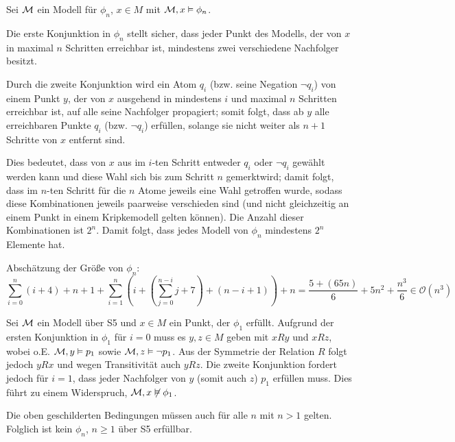 Sei $\mathcal{M}$ ein Modell für $\phi_n$, $x\in M$ mit $\mathcal{M}, x \vDash
\phi_n$.

Die erste Konjunktion in $\phi_n$ stellt sicher, dass jeder Punkt des
Modells, der von $x$ in maximal $n$ Schritten erreichbar ist, mindestens zwei
verschiedene Nachfolger besitzt.

Durch die zweite Konjunktion wird ein Atom $q_i$ (bzw. seine Negation $\neg q_i$)
von einem Punkt $y$, der von $x$ ausgehend in mindestens $i$ und maximal $n$
Schritten erreichbar ist, auf alle seine Nachfolger propagiert; somit folgt,
dass ab $y$ alle erreichbaren Punkte $q_i$ (bzw. $\neg q_i$) erfüllen,
solange sie nicht weiter als $n+1$ Schritte von $x$ entfernt sind.

Dies bedeutet, dass von $x$ aus im $i$-ten Schritt entweder $q_i$ oder $\neg
q_i$ gewählt werden kann und diese Wahl sich bis zum Schritt $n$ \glqq
gemerkt\grqq wird; damit folgt, dass im $n$-ten Schritt für die $n$ Atome
jeweils eine Wahl getroffen wurde, sodass diese Kombinationen jeweils paarweise
verschieden sind (und nicht gleichzeitig an einem Punkt in einem Kripkemodell
gelten können). Die Anzahl dieser Kombinationen ist $2^n$. Damit folgt, dass
jedes Modell von $\phi_n$ mindestens $2^n$ Elemente hat.

Abschätzung der Größe von $\phi_n$:
\[
\sum_{i=0}^{n}(i + 4) + n + 1 + \sum_{i=1}^{n}\left(i + \left(\sum_{j=0}^{n-i}
j + 7\right) + (n - i + 1) \right) + n = \frac{5+(65 n)}{6}+5 n^2+\frac{n^3}{6}
\in \mathcal{O}(n^3)
\]

Sei $\mathcal{M}$ ein Modell über S5 und $x \in M$ ein Punkt, der $\phi_1$ erfüllt. Aufgrund der ersten Konjunktion in
$\phi_1$ für $i = 0$ muss es $y, z \in M$ geben mit $xRy$ und $xRz$, wobei o.E. $\mathcal{M}, y \vDash p_1$ sowie
$\mathcal{M}, z \vDash \neg p_1$. Aus der Symmetrie der Relation $R$ folgt jedoch $yRx$ und wegen Transitivität auch
$yRz$. Die zweite Konjunktion fordert jedoch für $i = 1$, dass jeder Nachfolger von $y$ (somit auch $z$) $p_1$ erfüllen
muss. Dies führt zu einem Widerspruch, $\mathcal{M}, x \not\vDash \phi_1$.

Die oben geschilderten Bedingungen müssen auch für alle $n$ mit $n > 1$ gelten. Folglich ist kein $\phi_n$, $n \geq 1$ über
S5 erfüllbar.

